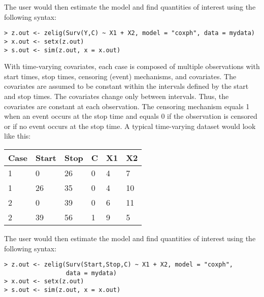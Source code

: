 \noindent The user would then estimate the model and find quantities of interest using the following syntax:

\begin{verbatim}
> z.out <- zelig(Surv(Y,C) ~ X1 + X2, model = "coxph", data = mydata)
> x.out <- setx(z.out)
> s.out <- sim(z.out, x = x.out)
\end{verbatim}

\noindent With time-varying covariates, each case is composed of multiple observations with start times, stop times, censoring (event) mechanisms, and covariates.  The covariates are assumed to be constant within the intervals defined by the start and stop times.  The covariates change only between intervals.  Thus, the covariates are constant at each observation.  The censoring mechanism equals 1 when an event occurs at the stop time and equals 0 if the observation is censored or if no event occurs at the stop time.  A typical time-varying dataset would look like this:

\begin{table}[!htp]
 \begin{center}
\begin{tabular}{llllll}
\hline
Case & Start & Stop & C & X1 & X2 \\ 
\hline
1 & 0 & 26 & 0 & 4 & 7 \\
1 & 26 & 35 & 0 & 4 & 10 \\
2 & 0 & 39 & 0 & 6 & 11 \\ 
2 & 39 & 56 & 1 & 9 & 5 \\
\hline
\end{tabular}
 \end{center}
\end{table}

\noindent The user would then estimate the model and find quantities of interest using the following syntax:

\begin{verbatim}
> z.out <- zelig(Surv(Start,Stop,C) ~ X1 + X2, model = "coxph", 
                 data = mydata)
> x.out <- setx(z.out)
> s.out <- sim(z.out, x = x.out)
\end{verbatim}


